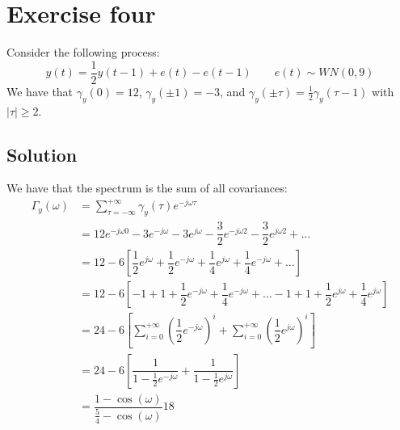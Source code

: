 \section{Exercise four}

Consider the following process: 
\[y(t)=\dfrac{1}{2}y(t-1)+e(t)-e(t-1) \qquad e(t)\sim WN(0,9)\]
We have that $\gamma_y(0)=12$, $\gamma_y(\pm 1)=-3$, and $\gamma_y(\pm\tau)=\frac{1}{2}\gamma_y(\tau-1)$ with $\left\lvert \tau \right\rvert  \geq 2$. 

\subsection{Solution}
We have that the spectrum is the sum of all covariances: 
\begin{align*}
    \Gamma_y(\omega)    &=\sum_{\tau=-\infty}^{+\infty}\gamma_y(\tau)e^{-j\omega\tau} \\
                        &=12e^{-j\omega 0}-3e^{-j\omega}-3e^{j\omega}-\dfrac{3}{2}e^{-j\omega 2}-\dfrac{3}{2}e^{j\omega 2}+\dots \\
                        &= 12-6\left[\dfrac{1}{2}e^{j\omega}+\dfrac{1}{2}e^{-j\omega}+\dfrac{1}{4}e^{j\omega}+\dfrac{1}{4}e^{-j\omega}+\dots \right] \\
                        &= 12-6\left[-1+1+\dfrac{1}{2}e^{-j\omega}+\dfrac{1}{4}e^{-j\omega}+\dots-1+1+\dfrac{1}{2}e^{j\omega}+\dfrac{1}{4}e^{j\omega} \right] \\  
                        &= 24-6\left[\sum_{i=0}^{+\infty}\left(\dfrac{1}{2}e^{-j\omega}\right)^i+ \sum_{i=0}^{+\infty}\left(\dfrac{1}{2}e^{j\omega}\right)^i\right] \\  
                        &= 24-6\left[\dfrac{1}{1-\frac{1}{2}e^{-j\omega}}+ \dfrac{1}{1-\frac{1}{2}e^{j\omega}}\right] \\        
                        &=\dfrac{1-\cos(\omega)}{\frac{5}{4}-\cos(\omega)}18
\end{align*}